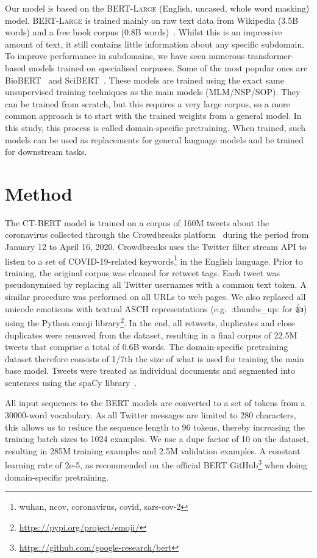 \documentclass{article}
\begin{document}
Our model is based on the \textsc{BERT-Large} (English, uncased, whole word masking) model.
\textsc{BERT-Large} is trained mainly on raw text data from Wikipedia (3.5B words) and a free book corpus (0.8B words)~\cite{devlin2018bert}.
Whilst this is an impressive amount of text, it still contains little information about any specific subdomain.
To improve performance in subdomains, we have seen numerous transformer-based models trained on specialised corpuses.
Some of the most popular ones are BioBERT~\cite{lee2020biobert} and SciBERT~\cite{beltagy2019scibert}.
These models are trained using the exact same unsupervised training techniques as the main models (MLM/NSP/SOP).
They can be trained from scratch, but this requires a very large corpus, so a more common approach is to start with the trained weights from a general model.
In this study, this process is called domain-specific pretraining.
When trained, such models can be used as replacements for general language models and be trained for downstream tasks.

\section{Method}
\label{sec:introduction}
The \textsc{CT-BERT} model is trained on a corpus of \num{160}M tweets about the coronavirus collected through the Crowdbreaks platform~\cite{muller2019crowdbreaks} during the period from January 12 to April 16, 2020.
Crowdbreaks uses the Twitter filter stream API to listen to a set of COVID-19-related keywords\footnote{wuhan, ncov, coronavirus, covid, sars-cov-2} in the English language.
Prior to training, the original corpus was cleaned for retweet tags.
Each tweet was pseudonymised by replacing all Twitter usernames with a common text token.
A similar procedure was performed on all URLs to web pages.
We also replaced all unicode emoticons with textual ASCII representations (e.g.\ :thumbs\_up: for 👍) using the Python emoji library\footnote{\url{https://pypi.org/project/emoji/}}.
In the end, all retweets, duplicates and close duplicates were removed from the dataset, resulting in a final corpus of 22.5M tweets that comprise a total of 0.6B words.
The domain-specific pretraining dataset therefore consists of 1/7th the size of what is used for training the main base model.
Tweets were treated as individual documents and segmented into sentences using the spaCy library~\cite{honnibal2017spacy}.

All input sequences to the BERT models are converted to a set of tokens from a \num{30000}-word vocabulary.
As all Twitter messages are limited to 280 characters, this allows us to reduce the sequence length to 96 tokens, thereby increasing the training batch sizes to \num{1024} examples.
We use a dupe factor of 10 on the dataset, resulting in 285M training examples and 2.5M validation examples.
A constant learning rate of 2e-5, as recommended on the official BERT GitHub\footnote{\url{https://github.com/google-research/bert}} when doing domain-specific pretraining.
\end{document}
